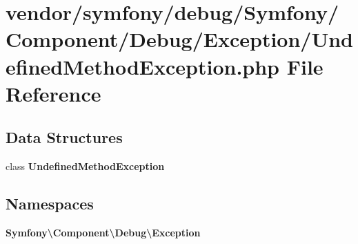 \section{vendor/symfony/debug/\+Symfony/\+Component/\+Debug/\+Exception/\+Undefined\+Method\+Exception.php File Reference}
\label{_undefined_method_exception_8php}
\subsection*{Data Structures}
\begin{DoxyCompactItemize}
\item 
class {\bf Undefined\+Method\+Exception}
\end{DoxyCompactItemize}
\subsection*{Namespaces}
\begin{DoxyCompactItemize}
\item 
 {\bf Symfony\textbackslash{}\+Component\textbackslash{}\+Debug\textbackslash{}\+Exception}
\end{DoxyCompactItemize}
